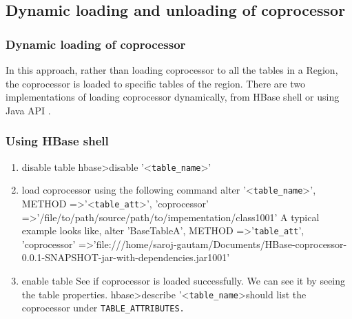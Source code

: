 \documentclass[11pt,a4paper,bibtotoc,idxtotoc,headsepline,footsepline,footexclude,BCOR12mm,DIV13]{scrbook}
\begin{document}
\subsection{Dynamic loading and unloading of coprocessor}

\subsubsection{Dynamic loading of coprocessor}
In this approach, rather than loading coprocessor to all the tables in a Region, the coprocessor is loaded to specific tables of the region. There are two implementations of loading coprocessor dynamically, from HBase shell or using Java API \cite{hbase:site}.

\subsubsection{Using HBase shell}
\begin{enumerate}
	\item disable table \newline
			\space \space hbase\textgreater disable '\textless \texttt{table\_name}\textgreater'
	\item load coprocessor using the following command \newline
	alter '\textless \texttt{table\_name}\textgreater', \newline 
	METHOD =\textgreater '\textless \texttt{table\_att}\textgreater', 'coprocessor' =\textgreater '/file/to/path\text{\textbar}\newline/source/path/to/impementation/class\text{\textbar}1001\text{\textbar}'
	\newline \newline
	A typical example looks like,\newline \newline
	alter 'BaseTableA', METHOD =\textgreater '\texttt{table\_att}', 'coprocessor' =\textgreater 'file:///home/saroj-gautam/Documents/HBase-coprocessor-0.0.1-SNAPSHOT-jar-with-dependencies.jar\text{\textbar}\texttt {}\text{\textbar}1001\text{\textbar}'
	
	\item enable table \newline
	See if coprocessor is loaded successfully. We can see it by seeing the table properties. \newline 
	hbase\textgreater describe '\textless \texttt{table\_name}\textgreater \space should list the coprocessor under \texttt{TABLE\_ATTRIBUTES.} \newline

\end{enumerate}
\end{document}

